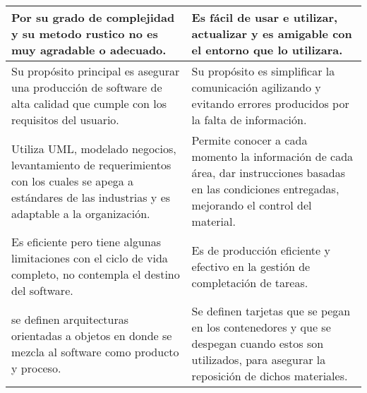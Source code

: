 \documentclass[a4paper,11pt]{report}
\begin{document}
\begin{center}
\begin{tabular}{ | p{7cm} | p{7cm} |}
    Por su grado de complejidad y su metodo rustico no es muy agradable o adecuado. & Es fácil de usar e utilizar, actualizar y es amigable con el entorno que lo utilizara. \\ \hline
    Su propósito principal es asegurar una producción de software de alta calidad que cumple con los requisitos del usuario. & Su propósito es simplificar la comunicación agilizando y evitando errores producidos por la falta de información. \\
    \hline
    Utiliza UML, modelado negocios, levantamiento de requerimientos con los cuales se apega a estándares de las industrias y es adaptable a la organización. & Permite conocer a cada momento la información de cada área, dar instrucciones basadas en las condiciones entregadas, mejorando el control del material.\\ \hline
    Es eficiente pero tiene algunas limitaciones con el ciclo de vida completo, no contempla el destino del software. & Es de producción eficiente y efectivo en la gestión de completación de tareas. \\ \hline
    se definen arquitecturas orientadas a objetos en donde se mezcla al software como producto y proceso. & Se definen tarjetas que se pegan en los contenedores y que se despegan cuando estos son utilizados, para asegurar la reposición de dichos materiales. \\ \hline
    \end{tabular}
\end{center}
\end{document}
